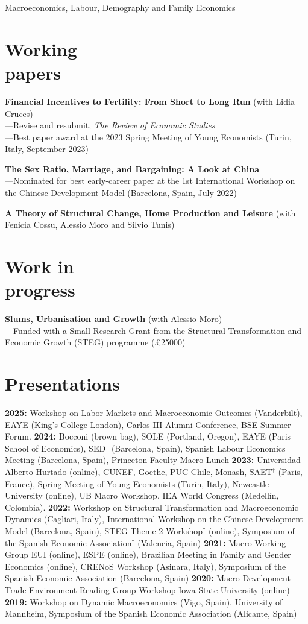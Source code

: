 \documentclass[margin]{res} %
\begin{document}
\begin{resume}
Macroeconomics, Labour, Demography and Family Economics

\section{Working \\ papers}
{\bf Financial Incentives to Fertility: From Short to Long Run} (with Lidia Cruces) \\
---Revise and resubmit, {\sl The Review of Economic Studies} \\
---Best paper award at the 2023 Spring Meeting of Young Economists (Turin, Italy, September 2023)

{\bf The Sex Ratio, Marriage, and Bargaining: A Look at China}  \\
---Nominated for best early-career paper at the 1st International Workshop on the Chinese Development Model (Barcelona, Spain, July 2022) 

{\bf A Theory of Structural Change, Home Production and Leisure} (with Fenicia Cossu, Alessio Moro and Silvio Tunis) 

\section{Work in \\ progress}
{\bf Slums, Urbanisation and Growth} (with Alessio Moro) \\
---Funded with a Small Research Grant from the Structural Transformation and Economic Growth (STEG) programme (£25000)

\section{Presentations}

{\bf 2025:} Workshop on Labor Markets and Macroeconomic Outcomes (Vanderbilt), EAYE (King's College London), Carlos III Alumni Conference, BSE Summer Forum. 
{\bf 2024:} Bocconi (brown bag), SOLE (Portland, Oregon), EAYE (Paris School of Economics), SED$^\dagger$ (Barcelona, Spain), Spanish Labour Economics Meeting (Barcelona, Spain), Princeton Faculty Macro Lunch {\bf 2023:} Universidad Alberto Hurtado (online), CUNEF, Goethe, PUC Chile, Monash, SAET$^\dagger$ (Paris, France), Spring Meeting of Young Economists (Turin, Italy), Newcastle University (online), UB Macro Workshop, IEA World Congress (Medell\'in, Colombia). {\bf 2022:} Workshop on Structural Transformation and Macroeconomic Dynamics (Cagliari, Italy), International Workshop on the Chinese Development Model (Barcelona, Spain), STEG Theme 2 Workshop$^\dagger$ (online), Symposium of the Spanish Economic Association$^\dagger$ (Valencia, Spain) {\bf 2021:} Macro Working Group EUI (online), ESPE (online), Brazilian Meeting in Family and Gender Economics (online), CRENoS Workshop (Asinara, Italy), Symposium of the Spanish Economic Association (Barcelona, Spain) {\bf 2020:} Macro-Development-Trade-Environment Reading Group Workshop Iowa State University (online) {\bf 2019:} Workshop on Dynamic Macroeconomics (Vigo, Spain), University of Mannheim, Symposium of the Spanish Economic Association (Alicante, Spain)


\end{resume}
\end{document}
